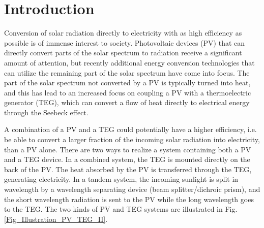 \documentclass[fleqn,10pt]{SelfArx} %
\affiliation{\textit{Department of Energy Conversion and Storage, Technical University of Denmark - DTU, Frederiksborgvej 399, DK-4000 Roskilde, Denmark}} %
\affiliation{*\textbf{Corresponding author}: rabj@dtu.dk} %
\begin{document}
\flushbottom %

\maketitle %


\thispagestyle{empty} %

\section{Introduction}
Conversion of solar radiation directly to electricity with as high efficiency as possible is of immense interest to society. Photovoltaic devices (PV) that can directly convert parts of the solar spectrum to radiation receive a significant amount of attention, but recently additional energy conversion technologies that can utilize the remaining part of the solar spectrum have come into focus. The part of the solar spectrum not converted by a PV is typically turned into heat, and this has lead to an increased focus on coupling a PV with a thermoelectric generator (TEG), which can convert a flow of heat directly to electrical energy through the Seebeck effect.

A combination of a PV and a TEG could potentially have a higher efficiency, i.e. be able to convert a larger fraction of the incoming solar radiation into electricity, than a PV alone. There are two ways to realize a system containing both a PV and a TEG device. In a combined system, the TEG is mounted directly on the back of the PV. The heat absorbed by the PV is transferred through the TEG, generating electricity. In a tandem system, the incoming sunlight is split in wavelength by a wavelength separating device (beam splitter/dichroic prism), and the short wavelength radiation is sent to the PV while the long wavelength goes to the TEG. The two kinds of PV and TEG systems are illustrated in Fig. \ref{Fig_Illustration_PV_TEG_II}.
\end{document}
